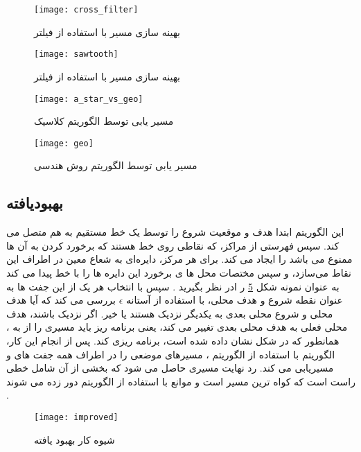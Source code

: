 \begin{figure}[h]
	\texttt{[image: cross\_filter]}
	\centering
	\caption{بهینه سازی  مسیر با استفاده از فیلتر }
	\cite{paliwal2023survey}
	\label{crosspath:fig1}
\end{figure} 

\begin{figure}[h]
	\texttt{[image: sawtooth]}
	\centering
	\caption{بهینه سازی  مسیر با استفاده از فیلتر }
	\cite{paliwal2023survey}
	\label{sawtooth:fig2}
\end{figure}
\begin{figure}[h]
	\texttt{[image: a\_star\_vs\_geo]}
	\centering
	\caption{مسیر یابی توسط الگوریتم کلاسیک }
	\cite{paliwal2023survey}
	\label{a_star}
	\end{figure}
	
\begin{figure}[h]
	\texttt{[image: geo]}
	\centering
	\caption{ مسیر یابی توسط الگوریتم روش هندسی }
	\cite{paliwal2023survey}
	\label{geo}
\end{figure}
\subsection{بهبودیافته}
این الگوریتم ابتدا هدف و موقعیت شروع را توسط یک خط مستقیم به هم متصل می کند. سپس فهرستی از مراکز، که نقاطی روی خط هستند که برخورد کردن به آن ها ممنوع می باشد را  ایجاد می کند. برای هر مرکز، دایره‌ای به شعاع معین  
در اطراف این نقاط می‌سازد، و سپس مختصات محل ها ی برخورد این دایره ها را با خط پیدا می کند به عنوان نمونه شکل 
\ref{improved}
 ر ادر نظر بگیرید . سپس با انتخاب هر یک از این جفت ها به عنوان نقطه شروع و هدف محلی، با استفاده از آستانه
  $\epsilon$
 بررسی می کند که آیا هدف محلی 
  و شروع محلی بعدی 
 به یکدیگر نزدیک هستند یا خیر. اگر نزدیک باشند، هدف محلی فعلی به هدف محلی بعدی تغییر می کند، یعنی برنامه ریز باید مسیری را از 
 به
 ، همانطور که در شکل نشان داده شده است، برنامه ریزی کند. پس از انجام این کار، الگوریتم با استفاده از الگوریتم 
 ، مسیرهای موضعی را در اطراف همه جفت های 
 و 
  مسیریابی می کند.  رد نهایت مسیری حاصل می شود که بخشی از آن شامل خطی راست است که کواه ترین مسیر است و موانع با استفاده از الگوریتم
    دور زده می شوند .

\begin{figure}[h]
	\texttt{[image: improved]}
	\centering
	\caption{ شیوه کار  بهبود یافته}
	\cite{paliwal2023survey}
	\label{improved}
\end{figure}
